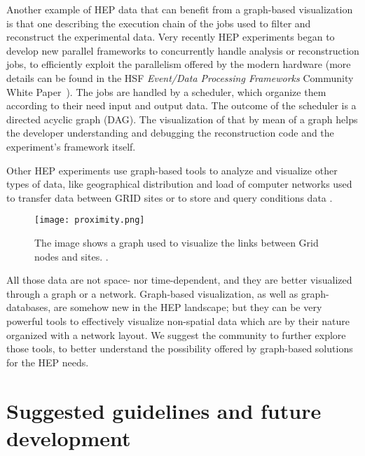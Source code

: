 \documentclass[12pt,a4paper]{article}
\begin{document}
Another example of HEP data that can benefit from a graph-based visualization is that one describing the execution chain of the jobs
used to filter and reconstruct the experimental data. Very recently HEP experiments began to develop new parallel frameworks
to concurrently handle analysis or reconstruction jobs, to efficiently exploit the parallelism offered by the modern hardware
(more details can be found in the HSF \textit{Event/Data Processing Frameworks} Community White Paper~\cite{HSF-CWP-2017-08}).
The jobs are handled by a scheduler, which organize them according to their need input and output data. The outcome of the scheduler
is a directed acyclic graph (DAG). The visualization of that by mean of a graph helps the developer understanding and debugging the
reconstruction code and the experiment’s framework itself.

Other HEP experiments use graph-based tools to analyze and visualize other types of data, like geographical distribution and load of computer
networks used to transfer data between GRID sites \cite{WLCGproximity}
 or to store and query conditions data \cite{Clemencic:2012cw}.

\begin{figure}
	\centering
	\texttt{[image: proximity.png]}
	\caption[A graph used to visualized links between Grid nodes]{The image shows a graph used to visualize the links between Grid nodes and sites. \cite{WLCGproximity}.}
	\label{fig:currentvisualizationlandscape}
\end{figure}


All those data are not space- nor time-dependent, and they are better visualized through a graph or a network. Graph-based visualization,
as well as graph-databases, are somehow new in the HEP landscape; but they can be very powerful tools to effectively visualize
non-spatial data which are by their nature organized with a network layout. We suggest the community to further explore those tools,
to better understand the possibility offered by graph-based solutions for the HEP needs.



\hypertarget{suggested-guidelines}{%
\section{Suggested guidelines and future development}\label{suggested-guidelines}}
\end{document}

